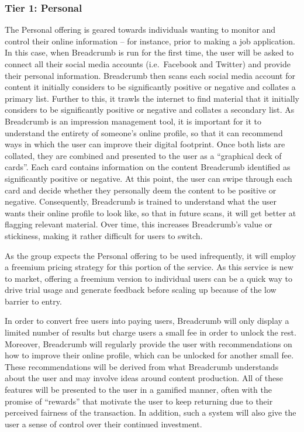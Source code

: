 \subsubsection{Tier 1: Personal}

The Personal offering is geared towards individuals wanting to monitor and control their online information -- for instance, prior to making a job application. In this case, when Breadcrumb is run for the first time, the user will be asked to connect all their social media accounts (i.e.~Facebook and Twitter) and provide their personal information. Breadcrumb then scans each social media account for content it initially considers to be significantly positive or negative and collates a primary list. Further to this, it trawls the internet to find material that it initially considers to be significantly positive or negative and collates a secondary list. As Breadcrumb is an impression management tool, it is important for it to understand the entirety of someone's online profile, so that it can recommend ways in which the user can improve their digital footprint. Once both lists are collated, they are combined and presented to the user as a ``graphical deck of cards''. Each card contains information on the content Breadcrumb identified as significantly positive or negative. At this point, the user can swipe through each card and decide whether they personally deem the content to be positive or negative. Consequently, Breadcrumb is trained to understand what the user wants their online profile to look like, so that in future scans, it will get better at flagging relevant material. Over time, this increases Breadcrumb's value or stickiness, making it rather difficult for users to switch.

As the group expects the Personal offering to be used infrequently, it will employ a freemium pricing strategy for this portion of the service. As this service is new to market, offering a freemium version to individual users can be a quick way to drive trial usage and generate feedback before scaling up because of the low barrier to entry.

In order to convert free users into paying users, Breadcrumb will only display a limited number of results but charge users a small fee in order to unlock the rest. Moreover, Breadcrumb will regularly provide the user with recommendations on how to improve their online profile, which can be unlocked for another small fee. These recommendations will be derived from what Breadcrumb understands about the user and may involve ideas around content production. All of these features will be presented to the user in a gamified manner, often with the promise of ``rewards'' that motivate the user to keep returning due to their perceived fairness of the transaction. In addition, such a system will also give the user a sense of control over their continued investment.

